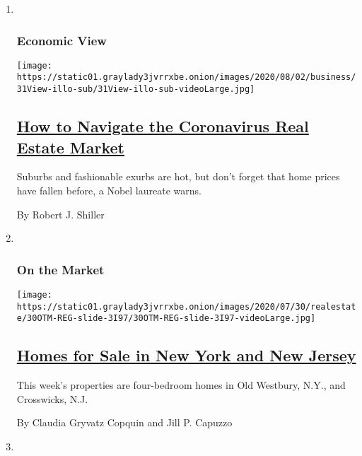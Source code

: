 \begin{enumerate}
\def\labelenumi{\arabic{enumi}.}
\item ~
  \hypertarget{economic-view}{%
  \subsubsection{Economic View}\label{economic-view}}

  \texttt{[image: https://static01.graylady3jvrrxbe.onion/images/2020/08/02/business/31View-illo-sub/31View-illo-sub-videoLarge.jpg]}

  \hypertarget{how-to-navigate-the-coronavirus-real-estate-market}{%
  \subsection{\texorpdfstring{\href{/2020/07/31/business/housing-market-prices-risk.html}{How
  to Navigate the Coronavirus Real Estate
  Market}}{How to Navigate the Coronavirus Real Estate Market}}\label{how-to-navigate-the-coronavirus-real-estate-market}}

  Suburbs and fashionable exurbs are hot, but don't forget that home
  prices have fallen before, a Nobel laureate warns.

  By Robert J. Shiller
\item ~
  \hypertarget{on-the-market-1}{%
  \subsubsection{On the Market}\label{on-the-market-1}}

  \texttt{[image: https://static01.graylady3jvrrxbe.onion/images/2020/07/30/realestate/30OTM-REG-slide-3I97/30OTM-REG-slide-3I97-videoLarge.jpg]}

  \hypertarget{homes-for-sale-in-new-york-and-new-jersey}{%
  \subsection{\texorpdfstring{\href{/2020/07/30/realestate/homes-for-sale-in-new-york-and-new-jersey.html}{Homes
  for Sale in New York and New
  Jersey}}{Homes for Sale in New York and New Jersey}}\label{homes-for-sale-in-new-york-and-new-jersey}}

  This week's properties are four-bedroom homes in Old Westbury, N.Y.,
  and Crosswicks, N.J.

  By Claudia Gryvatz Copquin and Jill P. Capuzzo
\item ~
  \hypertarget{calculator}{%
}
\end{enumerate}

